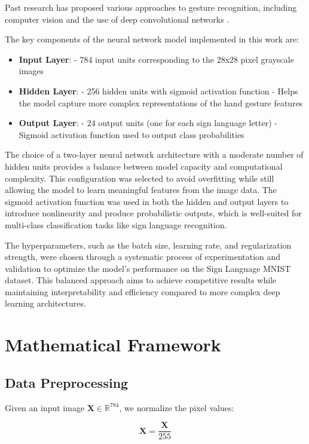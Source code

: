 \documentclass[times,final,english]{revdetua}
\begin{document}
Past research has proposed various approaches to gesture recognition, including computer vision \cite{garg, mitra} and the use of deep convolutional networks \cite{kurz2016using}.

The key components of the neural network model implemented in this work are:
\begin{itemize}
\item \textbf{Input Layer}:
- 784 input units corresponding to the 28x28 pixel grayscale images
\item \textbf{Hidden Layer}:
- 256 hidden units with sigmoid activation function
- Helps the model capture more complex representations of the hand gesture features
\item \textbf{Output Layer}:
- 24 output units (one for each sign language letter)
- Sigmoid activation function used to output class probabilities
\end{itemize}

The choice of a two-layer neural network architecture with a moderate number of hidden units provides a balance between model capacity and computational complexity. This configuration was selected to avoid overfitting while still allowing the model to learn meaningful features from the image data. The sigmoid activation function was used in both the hidden and output layers to introduce nonlinearity and produce probabilistic outputs, which is well-suited for multi-class classification tasks like sign language recognition.

The hyperparameters, such as the batch size, learning rate, and regularization strength, were chosen through a systematic process of experimentation and validation to optimize the model's performance on the Sign Language MNIST dataset. This balanced approach aims to achieve competitive results while maintaining interpretability and efficiency compared to more complex deep learning architectures.


\section{Mathematical Framework}

\subsection{Data Preprocessing}
Given an input image $\mathbf{X} \in \mathbb{R}^{784}$, we normalize the pixel values:

$$\mathbf{X} = \frac{\mathbf{X}}{255}$$
\end{document}
